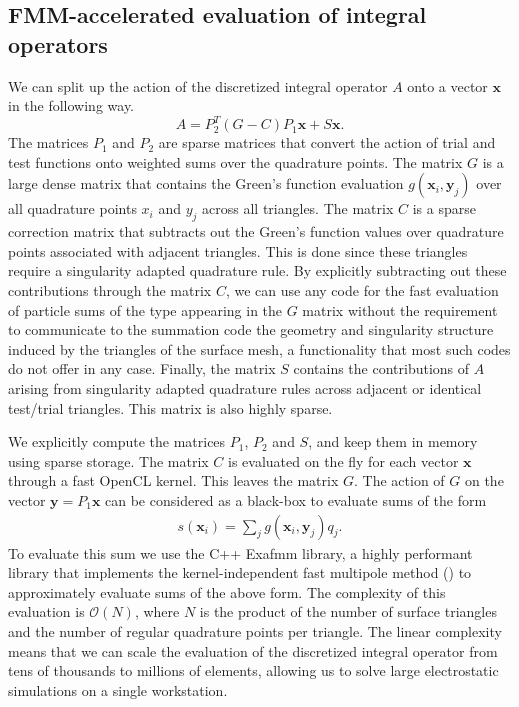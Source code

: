 \subsection{FMM-accelerated evaluation of integral operators}
We can split up the action of the discretized integral operator $A$ onto a vector $\mathbf{x}$ in the following way.
$$
A = P_2^T (G - C)P_1 \mathbf{x} + S \mathbf{x}.
$$
The matrices $P_1$ and $P_2$ are sparse matrices that convert the action of trial and test functions onto weighted sums over the quadrature points.
The matrix $G$ is a large dense matrix that contains the Green's function evaluation $g(\mathbf{x}_i, \mathbf{y}_j)$ over all quadrature points $x_i$ and $y_j$ across all triangles.
The matrix $C$ is a sparse correction matrix that subtracts out the Green's function values over quadrature points associated with  adjacent triangles.
This is done since these triangles require a singularity adapted quadrature rule.
By explicitly subtracting out these contributions through the matrix $C$, we can use any code for the fast evaluation of particle sums of the type appearing in the $G$ matrix without the requirement to communicate to the summation code the geometry and singularity structure induced by the triangles of the surface mesh, a functionality that most such codes do not offer in any case.
Finally, the matrix $S$ contains the contributions of $A$ arising from singularity adapted quadrature rules across adjacent or identical test/trial triangles.
This matrix is also highly sparse.

We explicitly compute the matrices $P_1$, $P_2$ and $S$, and keep them in memory using sparse storage.
The matrix $C$ is evaluated on the fly for each vector $\mathbf{x}$ through a fast OpenCL kernel.
This leaves the matrix $G$.
The action of $G$ on the vector $\mathbf{y}=P_1 \mathbf{x}$ can be considered as a black-box to evaluate sums of the form
%
\begin{align}\label{eq:nbody_sum}
s(\mathbf{x}_i) = \sum_j g(\mathbf{x}_i, \mathbf{y}_j)q_j.
\end{align}
%
To evaluate this sum we use the C++ Exafmm library, a highly performant library that implements the kernel-independent fast multipole method (\kifmm) to approximately evaluate sums of the above form.
The complexity of this evaluation is $\mathcal{O}(N)$, where $N$ is the product of the number of surface triangles and the number of regular quadrature points per triangle.
The linear complexity means that we can scale the evaluation of the discretized integral operator from tens of thousands to millions of elements, allowing us to solve large  electrostatic simulations on a single workstation.
